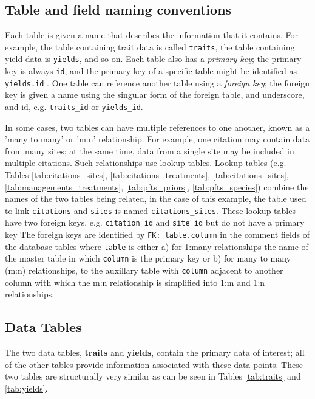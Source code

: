 \documentclass[10pt]{article}
\begin{document}
\subsection{Table and field naming conventions}
 Each table is given a name that describes the information that it contains.
 For example, the table containing trait data is called \verb+traits+, the table containing yield data is \verb+yields+, and so on.
 Each table also has a \emph{primary key}; the primary key is always \verb+id+, and the primary key of a specific table might be identified as \verb+yields.id+ . 
 One table can reference another table using a \emph{foreign key}; the foreign key is given a name using the singular form of the foreign table, and underscore, and id, e.g. \verb+traits_id+ or \verb+yields_id+.
 
 In some cases, two tables can have multiple references to one another, known as a 'many to many' or 'm:n' relationship. 
 For example, one citation may contain data from many sites; at the same time, data from a single site may be included in multiple citations.
 Such relationships use lookup tables.
 Lookup tables (e.g. Tables \ref{tab:citations_sites}, \ref{tab:citations_treatments}, \ref{tab:citations_sites}, \ref{tab:managements_treatments}, \ref{tab:pfts_priors}, \ref{tab:pfts_species}) combine the names of the two tables being related, in the case of this example, the table used to link \verb+citations+ and \verb+sites+ is named \verb+citations_sites+.
 These lookup tables have two foreign keys, e.g. \verb+citation_id+ and \verb+site_id+ but do not have a primary key 
 The foreign keys are identified by \texttt{FK: table.column} in the comment fields of the database tables where \texttt{table} is either a) for 1:many relationships the name of the master table in which \texttt{column} is the primary key or b) for many to many (m:n) relationships, to the auxillary table with \texttt{column} adjacent to another column with which the m:n relationship is simplified into 1:m and 1:n relationships.

\subsection{Data Tables}
 
 The two data tables, \textbf{traits} and \textbf{yields}, contain the primary data of interest; all of the other tables provide information associated with these data points.
 These two tables are structurally very similar as can be seen in Tables \ref{tab:traits} and \ref{tab:yields}.
 
\end{document}
